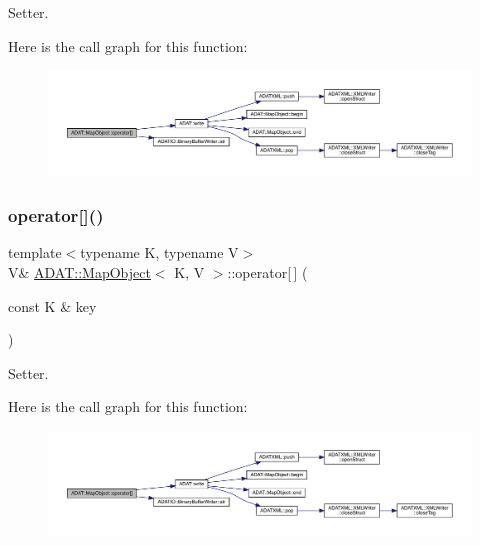 Setter. 

Here is the call graph for this function\+:
\nopagebreak
\begin{figure}[H]
\begin{center}
\leavevmode
\includegraphics[width=350pt]{da/d29/classADAT_1_1MapObject_ab6ac0d8eccffc7975fd329649dd6f9e7_cgraph}
\end{center}
\end{figure}
\mbox{\label{classADAT_1_1MapObject_ab6ac0d8eccffc7975fd329649dd6f9e7}} 
\subsubsection{\texorpdfstring{operator[]()}{operator[]()}\hspace{0.1cm}{\footnotesize\ttfamily [4/4]}}
{\footnotesize\ttfamily template$<$typename K, typename V$>$ \\
V\& \mbox{\hyperlink{classADAT_1_1MapObject}{A\+D\+A\+T\+::\+Map\+Object}}$<$ K, V $>$\+::operator\mbox{[}$\,$\mbox{]} (\begin{DoxyParamCaption}\item[{const K \&}]{key }\end{DoxyParamCaption})\hspace{0.3cm}{\ttfamily [inline]}}



Setter. 

Here is the call graph for this function\+:
\nopagebreak
\begin{figure}[H]
\begin{center}
\leavevmode
\includegraphics[width=350pt]{da/d29/classADAT_1_1MapObject_ab6ac0d8eccffc7975fd329649dd6f9e7_cgraph}
\end{center}
\end{figure}
\mbox{\label{classADAT_1_1MapObject_ac0f5c3b258d234a7baf4f3d75e304af7}} 
